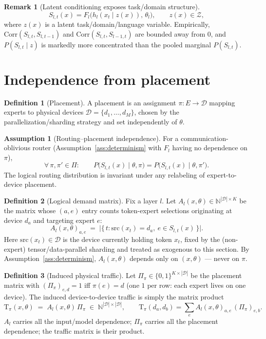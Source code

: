 \documentclass[11pt]{article}
\theoremstyle{definition}
\newtheorem{definition}{Definition}
\newtheorem{assumption}{Assumption}
\newtheorem{remark}{Remark}
\newcommand{\Traffic}{\mathrm{T}}
\begin{document}
\begin{remark}[Latent conditioning exposes task/domain structure]
\[
  S_{l,t}(x) = F_l\bigl(h_l(x_t\mid z(x)),\,\theta_l\bigr), \qquad z(x)\in\mathcal{Z},
\]
where $z(x)$ is a latent task/domain/language variable. Empirically,
$\mathrm{Corr}(S_{l,t},S_{l,t-1})$ and $\mathrm{Corr}(S_{l,t},S_{l-1,t})$ are
bounded away from $0$, and $P(S_{l,t}\mid z)$ is markedly more concentrated
than the pooled marginal $P(S_{l,t})$.
\end{remark}

\section{Independence from placement}

\begin{definition}[Placement]
A placement is an assignment $\pi:E\to\mathcal{D}$ mapping experts to physical
devices $\mathcal{D}=\{d_1,\dots,d_M\}$, chosen by the parallelization/sharding
strategy and set independently of $\theta$.
\end{definition}

\begin{assumption}[Routing--placement independence]
\label{ass:independence}
For a communication-oblivious router (Assumption~\ref{ass:determinism} with
$F_l$ having no dependence on $\pi$),
\[
  \forall\,\pi,\pi'\in\Pi:\qquad
  P\bigl(S_{l,t}(x)\mid\theta,\pi\bigr) = P\bigl(S_{l,t}(x)\mid\theta,\pi'\bigr).
\]
The logical routing distribution is invariant under any relabeling of
expert-to-device placement.
\end{assumption}

\begin{definition}[Logical demand matrix]
Fix a layer $l$. Let $A_l(x,\theta)\in\mathbb{N}^{|\mathcal{D}|\times K}$ be the
matrix whose $(a,e)$ entry counts token-expert selections originating at
device $d_a$ and targeting expert $e$:
\[
  A_l(x,\theta)_{a,e} \;=\; \bigl|\{\,t : \mathrm{src}(x_t)=d_a,\ e\in S_{l,t}(x)\,\}\bigr|.
\]
Here $\mathrm{src}(x_t)\in\mathcal{D}$ is the device currently holding token
$x_t$, fixed by the (non-expert) tensor/data-parallel sharding and treated as
exogenous to this section. By Assumption~\ref{ass:determinism},
$A_l(x,\theta)$ depends only on $(x,\theta)$ — never on $\pi$.
\end{definition}

\begin{definition}[Induced physical traffic]
\label{def:traffic}
Let $\Pi_\pi\in\{0,1\}^{K\times|\mathcal{D}|}$ be the placement matrix with
$(\Pi_\pi)_{e,d}=1$ iff $\pi(e)=d$ (one $1$ per row: each expert lives on one
device). The induced device-to-device traffic is simply the matrix product
\[
  \Traffic_\pi(x,\theta) \;=\; A_l(x,\theta)\,\Pi_\pi \;\in\;\mathbb{N}^{|\mathcal{D}|\times|\mathcal{D}|},
  \qquad
  \Traffic_\pi(d_a,d_b) = \sum_{e} A_l(x,\theta)_{a,e}\,(\Pi_\pi)_{e,b}.
\]
$A_l$ carries all the input/model dependence; $\Pi_\pi$ carries all the
placement dependence; the traffic matrix is their product.
\end{definition}
\end{document}
